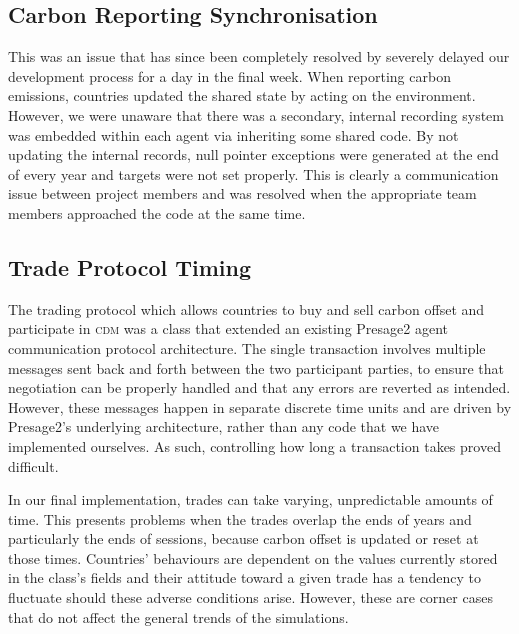\subsection{Carbon Reporting Synchronisation}

This was an issue that has since been completely resolved by severely delayed our development process for a day in the final week. When reporting carbon emissions, countries updated the shared state by acting on the environment. However, we were unaware that there was a secondary, internal recording system was embedded within each agent via inheriting some shared code. By not updating the internal records, null pointer exceptions were generated at the end of every year and targets were not set properly. This is clearly a communication issue between project members and was resolved when the appropriate team members approached the code at the same time.

\subsection{Trade Protocol Timing}

The trading protocol which allows countries to buy and sell carbon offset and participate in \textsc{cdm} was a class that extended an existing Presage2 agent communication protocol architecture. The single transaction involves multiple messages sent back and forth between the two participant parties, to ensure that negotiation can be properly handled and that any errors are reverted as intended. However, these messages happen in separate discrete time units and are driven by Presage2's underlying architecture, rather than any code that we have implemented ourselves. As such, controlling how long a transaction takes proved difficult.

In our final implementation, trades can take varying, unpredictable amounts of time. This presents problems when the trades overlap the ends of years and particularly the ends of sessions, because carbon offset is updated or reset at those times. Countries' behaviours are dependent on the values currently stored in the class's fields and their attitude toward a given trade has a tendency to fluctuate should these adverse conditions arise. However, these are corner cases that do not affect the general trends of the simulations.

